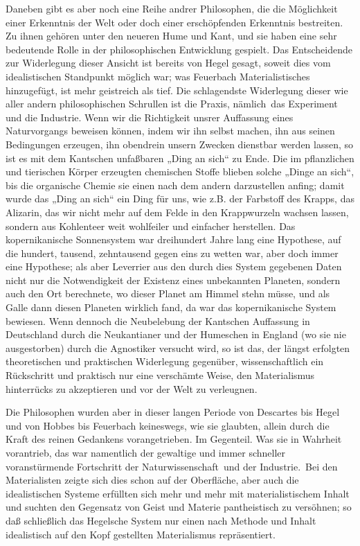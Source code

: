 Daneben gibt es aber noch eine Reihe andrer Philosophen, die die
Möglichkeit einer Erkenntnis der Welt oder doch einer erschöpfenden
Erkenntnis bestreiten. Zu ihnen gehören unter den neueren Hume und Kant,
und sie haben eine sehr bedeutende Rolle in der philosophischen
Entwicklung gespielt. Das Entscheidende zur Widerlegung dieser Ansicht
ist bereits von Hegel gesagt, soweit dies vom idealistischen Standpunkt
möglich war; was Feuerbach Materialistisches hinzugefügt, ist mehr
geistreich als tief. Die schlagendste Widerlegung dieser wie aller
andern philosophischen Schrullen ist die Praxis, nämlich\est\ das Experiment
und die Industrie. Wenn wir die Richtigkeit unsrer Auffassung eines
Naturvorgangs beweisen können, indem wir ihn selbst machen, ihn aus
seinen Bedingungen erzeugen, ihn obendrein unsern Zwecken dienstbar
werden lassen, so ist es mit dem Kantschen unfaßbaren „Ding an sich`` zu
Ende. Die im pflanzlichen und tierischen Körper erzeugten chemischen
Stoffe blieben solche „Dinge an sich``, bis die organische Chemie sie
einen nach dem andern darzustellen anfing; damit wurde das „Ding an
sich`` ein Ding für uns, wie z.B. der Farbstoff des Krapps, das Alizarin,
das wir nicht mehr auf dem Felde in den Krappwurzeln wachsen lassen,
sondern aus Kohlenteer weit wohlfeiler und einfacher herstellen. Das
kopernikanische Sonnensystem war dreihundert Jahre lang eine Hypothese,
auf die hundert, tausend, zehntausend gegen eins zu wetten war, aber
doch immer eine Hypothese; als aber Leverrier aus den durch dies System
gegebenen Daten nicht nur die Notwendigkeit der Existenz eines
unbekannten Planeten, sondern auch den Ort berechnete, wo dieser Planet
am Himmel stehn müsse, und als Galle dann diesen Planeten wirklich fand,
da war das kopernikanische System bewiesen. Wenn dennoch die Neubelebung
der Kantschen Auffassung in Deutschland durch die Neukantianer und der
Humeschen in England (wo sie nie ausgestorben) durch die Agnostiker
versucht wird, so ist das, der längst erfolgten theoretischen und
praktischen Widerlegung gegenüber, wissenschaftlich ein Rückschritt und
praktisch nur eine verschämte Weise, den Materialismus hinterrücks zu
akzeptieren und vor der Welt zu verleugnen.

Die Philosophen wurden aber in dieser langen Periode von
Descartes bis Hegel und von Hobbes bis Feuerbach keineswegs, wie sie
glaubten, allein durch die Kraft des reinen Gedankens vorangetrieben. Im
Gegenteil. Was sie in Wahrheit vorantrieb, das war namentlich der
gewaltige und immer schneller voranstürmende Fortschritt der
Naturwissenschaft \textbar{}\,und der Industrie.\,\textbar{} Bei den Materialisten zeigte
sich dies schon auf der Oberfläche, aber auch die idealistischen Systeme
erfüllten sich mehr und mehr mit materialistischem Inhalt und suchten
den Gegensatz von Geist und Materie pantheistisch zu versöhnen; so daß
schließlich das Hegelsche System nur einen nach Methode und Inhalt
idealistisch auf den Kopf gestellten Materialismus repräsentiert.

